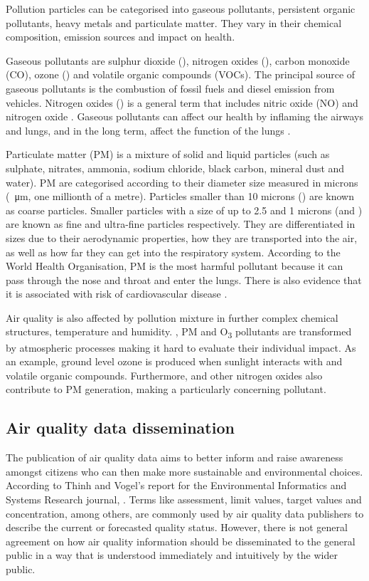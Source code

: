 Pollution particles can be categorised into gaseous pollutants, persistent organic pollutants, heavy metals and particulate matter. They vary in their chemical composition, emission sources and impact on health. 

Gaseous pollutants are sulphur dioxide (\SOTWO), nitrogen oxides (\NOX), carbon monoxide (CO), ozone (\OTHREE) and volatile organic compounds (VOCs). The principal source of gaseous pollutants is the combustion of fossil fuels and diesel emission from vehicles. Nitrogen oxides (\NOX) is a general term that includes nitric oxide (NO) and nitrogen oxide \NOTWO. Gaseous pollutants can affect our health by inflaming the airways and lungs, and in the long term, affect the function of the lungs \cite{AirQualityExpertGroup2004} \cite{WHO2003}.

Particulate matter (PM) is a mixture of solid and liquid particles (such as sulphate, nitrates, ammonia, sodium chloride, black carbon, mineral dust and water). PM are categorised according to their diameter size measured in microns (\SI{}{\micro\metre}, one millionth of a metre). Particles smaller than 10 microns (\PMTEN) are known as coarse particles. Smaller particles with a size of up to 2.5 and 1 microns (\PMTWO and \PMONE) are known as fine and ultra-fine particles respectively. They are differentiated in sizes due to their aerodynamic properties, how they are transported into the air, as well as how far they can get into the respiratory system. According to the World Health Organisation, PM is the most harmful pollutant because it can pass through the nose and throat and enter the lungs. There is also evidence that it is associated with risk of cardiovascular disease \cite{Polichetti2009}. 

Air quality is also affected by pollution mixture in further complex chemical structures, temperature and humidity. \NOTWO, PM and O\textsubscript{3}  pollutants are transformed by atmospheric processes making it hard to evaluate their individual impact. As an example, ground level ozone is produced when sunlight interacts with \NOTWO and volatile organic compounds. Furthermore, \NOTWO and other nitrogen oxides also contribute to PM generation, making \NOX a particularly concerning pollutant.

\subsection{Air quality data dissemination}
The publication of air quality data aims to better inform and raise awareness amongst citizens who can then make more sustainable and environmental choices. According to Thinh and Vogel’s report for the Environmental Informatics and Systems Research journal,  \cite{Thinh2007}. Terms like assessment, limit values, target values and concentration, among others, are commonly used by air quality data publishers to describe the current or forecasted quality status. However, there is not general agreement on how air quality information should be disseminated to the general public in a way that is understood immediately and intuitively by the wider public. 


